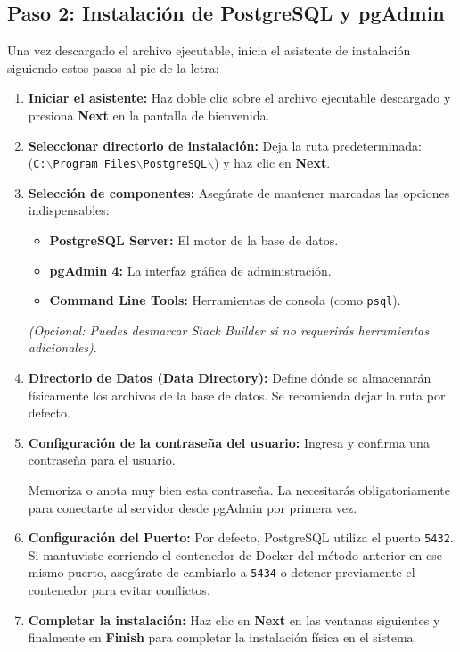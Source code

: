 \documentclass[11pt, a4paper]{article}
\begin{document}
\subsection{Paso 2: Instalación de PostgreSQL y pgAdmin}

Una vez descargado el archivo ejecutable, inicia el asistente de instalación siguiendo estos pasos al pie de la letra:

\begin{enumerate}
    \item \textbf{Iniciar el asistente:} 
    Haz doble clic sobre el archivo ejecutable descargado y presiona \textbf{Next} en la pantalla de bienvenida.

    \item \textbf{Seleccionar directorio de instalación:} 
    Deja la ruta predeterminada:\\ (\texttt{C:$\backslash$Program Files$\backslash$PostgreSQL$\backslash$}) y haz clic en \textbf{Next}.

    \item \textbf{Selección de componentes:} 
    Asegúrate de mantener marcadas las opciones indispensables:
    \begin{itemize}
        \item \textbf{PostgreSQL Server:} El motor de la base de datos.
        \item \textbf{pgAdmin 4:} La interfaz gráfica de administración.
        \item \textbf{Command Line Tools:} Herramientas de consola (como \texttt{psql}).
    \end{itemize}
    \textit{(Opcional: Puedes desmarcar Stack Builder si no requerirás herramientas adicionales)}.

    \item \textbf{Directorio de Datos (Data Directory):} 
    Define dónde se almacenarán físicamente los archivos de la base de datos. Se recomienda dejar la ruta por defecto.

    \item \textbf{Configuración de la contraseña del usuario:} 
    Ingresa y confirma una contraseña para el usuario. 
    
    \begin{tcolorbox}[colback=red!5!white,colframe=red!75!black,title=\textbf{¡Advertencia Importante!}]
    Memoriza o anota muy bien esta contraseña. La necesitarás obligatoriamente para conectarte al servidor desde pgAdmin por primera vez.
    \end{tcolorbox}

    \item \textbf{Configuración del Puerto:} 
    Por defecto, PostgreSQL utiliza el puerto \texttt{5432}. Si mantuviste corriendo el contenedor de Docker del método anterior en ese mismo puerto, asegúrate de cambiarlo a \texttt{5434} o detener previamente el contenedor para evitar conflictos.

    \item \textbf{Completar la instalación:} 
    Haz clic en \textbf{Next} en las ventanas siguientes y finalmente en \textbf{Finish} para completar la instalación física en el sistema.
\end{enumerate}
\end{document}
